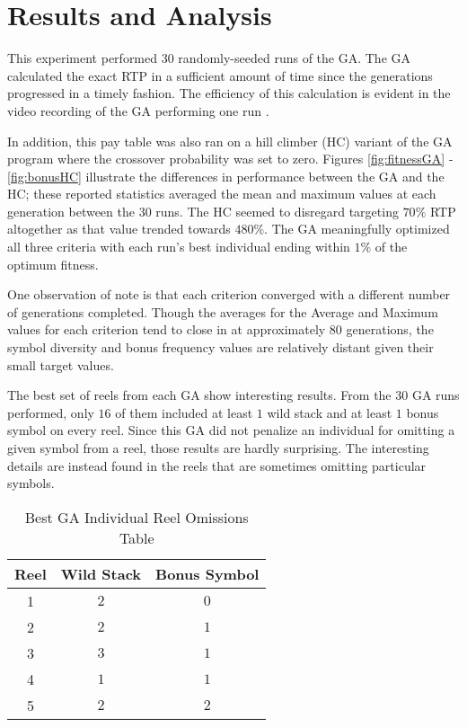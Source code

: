 \documentclass[conference]{IEEEtran}
\begin{document}
\section{Results and Analysis}
\label{result}
This experiment performed $30$ randomly-seeded runs of the GA.
The GA calculated the exact RTP in a sufficient amount of time since the generations progressed in a timely fashion. The efficiency of this calculation is evident in the video recording of the GA performing one run \cite{VideoRecording}.
\par
In addition, this pay table was also ran on a hill climber (HC) variant of the GA program where the crossover probability was set to zero.
Figures \ref{fig:fitnessGA} - \ref{fig:bonusHC} illustrate the differences in performance between the GA and the HC; these reported statistics averaged the mean and maximum values at each generation between the $30$ runs.
The HC seemed to disregard targeting $70\%$ RTP altogether as that value trended towards $480\%$.
The GA meaningfully optimized all three criteria with each run's best individual ending within $1\%$ of the optimum fitness.
\par
One observation of note is that each criterion converged with a different number of generations completed.
Though the averages for the Average and Maximum values for each criterion tend to close in at approximately $80$ generations, the symbol diversity and bonus frequency values are relatively distant given their small target values.
\par
The best set of reels from each GA show interesting results.
From the $30$ GA runs performed, only $16$ of them included at least $1$ wild stack and at least $1$ bonus symbol on every reel.
Since this GA did not penalize an individual for omitting a given symbol from a reel, those results are hardly surprising.
The interesting details are instead found in the reels that are sometimes omitting particular symbols.
\begin{table}[htbp]
\caption{Best GA Individual Reel Omissions Table}
\begin{center}
\begin{tabular}{|c|c|c|}
\hline
\textbf{Reel}&\textbf{Wild Stack}&\textbf{Bonus Symbol} \\
\hline
1 & $2$ & $0$ \\
\hline
2 & $2$ & $1$  \\
\hline
3 & $3$ & $1$ \\
\hline
4 & $1$ & $1$  \\
\hline
5 & $2$ & $2$  \\
\hline
\end{tabular}
\label{omissions}
\end{center}
\end{table}
\end{document}
